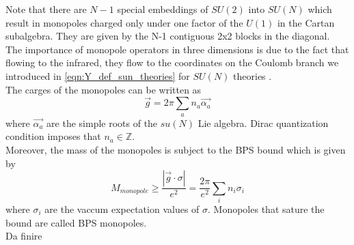 Note that there are $N-1$ special embeddings of $SU(2)$ into $SU(N)$ which result in monopoles charged only under one factor of the $U(1)$ in the Cartan subalgebra. They are given by the N-1 contiguous 2x2 blocks in the diagonal.\\
The importance of monopole operators in three dimensions is due to the fact that flowing to the infrared, they flow to the coordinates on the Coulomb branch we introduced in \eqref{eqn:Y_def_sun_theories} for $SU(N)$ theories \cite{Aharony:2013dha}.
\\
The carges of the monopoles can be written as
\begin{equation}
\vec{g}  = 2 \pi \sum_a n_a \vec{\alpha_a}
\end{equation}
where $\vec{\alpha_a}$ are the simple roots of the $su(N)$ Lie algebra. Dirac quantization condition imposes that $n_a \in \mathbb{Z}$.\\
Moreover, the mass of the monopoles is subject to the BPS bound which is given by
\begin{equation}
M_{monopole} \geq \frac{| \vec{g} \cdot \sigma| }{e^2} = \frac{2 \pi}{e^2} \sum_i n_i \sigma_i
\end{equation}
where $\sigma_i$ are the vaccum expectation values of $\sigma$.
Monopoles that sature the bound are called BPS monopoles.\\





{\huge Da finire}
 
 
 




































